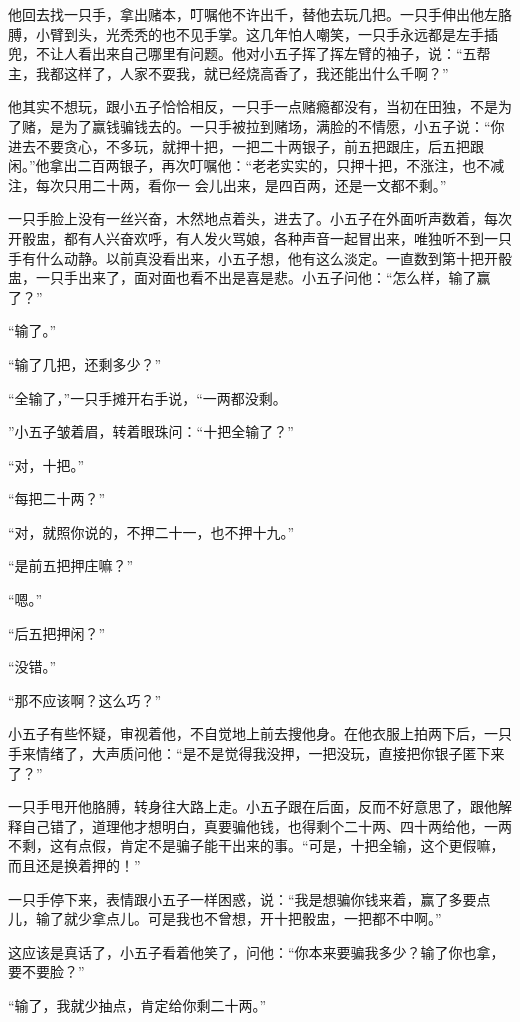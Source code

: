他回去找一只手，拿出赌本，叮嘱他不许出千，替他去玩几把。一只手伸出他左胳膊，小臂到头，光秃秃的也不见手掌。这几年怕人嘲笑，一只手永远都是左手插兜，不让人看出来自己哪里有问题。他对小五子挥了挥左臂的袖子，说：“五帮主，我都这样了，人家不耍我，就已经烧高香了，我还能出什么千啊？”

他其实不想玩，跟小五子恰恰相反，一只手一点赌瘾都没有，当初在田独，不是为了赌，是为了赢钱骗钱去的。一只手被拉到赌场，满脸的不情愿，小五子说：“你进去不要贪心，不多玩，就押十把，一把二十两银子，前五把跟庄，后五把跟闲。”他拿出二百两银子，再次叮嘱他：“老老实实的，只押十把，不涨注，也不减注，每次只用二十两，看你一
会儿出来，是四百两，还是一文都不剩。”

一只手脸上没有一丝兴奋，木然地点着头，进去了。小五子在外面听声数着，每次开骰盅，都有人兴奋欢呼，有人发火骂娘，各种声音一起冒出来，唯独听不到一只手有什么动静。以前真没看出来，小五子想，他有这么淡定。一直数到第十把开骰盅，一只手出来了，面对面也看不出是喜是悲。小五子问他：“怎么样，输了赢了？”

“输了。”

“输了几把，还剩多少？”

“全输了，”一只手摊开右手说，“一两都没剩。

”小五子皱着眉，转着眼珠问：“十把全输了？”

“对，十把。”

“每把二十两？”

“对，就照你说的，不押二十一，也不押十九。”

“是前五把押庄嘛？”

“嗯。”

“后五把押闲？”

“没错。”

“那不应该啊？这么巧？”

小五子有些怀疑，审视着他，不自觉地上前去搜他身。在他衣服上拍两下后，一只手来情绪了，大声质问他：“是不是觉得我没押，一把没玩，直接把你银子匿下来了？”

一只手甩开他胳膊，转身往大路上走。小五子跟在后面，反而不好意思了，跟他解释自己错了，道理他才想明白，真要骗他钱，也得剩个二十两、四十两给他，一两不剩，这有点假，肯定不是骗子能干出来的事。“可是，十把全输，这个更假嘛，而且还是换着押的！”

一只手停下来，表情跟小五子一样困惑，说：“我是想骗你钱来着，赢了多要点儿，输了就少拿点儿。可是我也不曾想，开十把骰盅，一把都不中啊。”

这应该是真话了，小五子看着他笑了，问他：“你本来要骗我多少？输了你也拿，要不要脸？”

“输了，我就少抽点，肯定给你剩二十两。”

